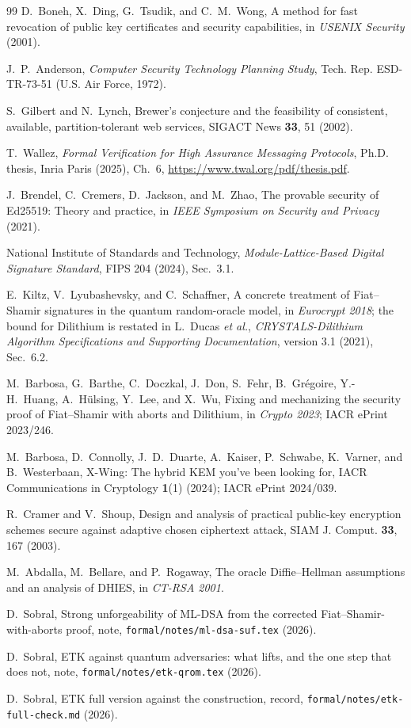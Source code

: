 \documentclass[aps,prx,reprint,superscriptaddress,nofootinbib,floatfix]{revtex4-2}
\theoremstyle{remark}
\begin{document}
\begin{thebibliography}{99}
 D.~Boneh, X.~Ding, G.~Tsudik, and C.~M.~Wong, A method for fast revocation of public key certificates and security capabilities, in \emph{USENIX Security} (2001).

 J.~P.~Anderson, \emph{Computer Security Technology Planning Study}, Tech. Rep. ESD-TR-73-51 (U.S. Air Force, 1972).

 S.~Gilbert and N.~Lynch, Brewer's conjecture and the feasibility of consistent, available, partition-tolerant web services, SIGACT News \textbf{33}, 51 (2002).

 T.~Wallez, \emph{Formal Verification for High Assurance Messaging Protocols}, Ph.D. thesis, Inria Paris (2025), Ch.~6, \url{https://www.twal.org/pdf/thesis.pdf}.

 J.~Brendel, C.~Cremers, D.~Jackson, and M.~Zhao, The provable security of Ed25519: Theory and practice, in \emph{IEEE Symposium on Security and Privacy} (2021).

 National Institute of Standards and Technology, \emph{Module-Lattice-Based Digital Signature Standard}, FIPS 204 (2024), Sec.~3.1.

 E.~Kiltz, V.~Lyubashevsky, and C.~Schaffner, A concrete treatment of Fiat--Shamir signatures in the quantum random-oracle model, in \emph{Eurocrypt 2018}; the bound for Dilithium is restated in L.~Ducas \emph{et al.}, \emph{CRYSTALS-Dilithium Algorithm Specifications and Supporting Documentation}, version 3.1 (2021), Sec.~6.2.

 M.~Barbosa, G.~Barthe, C.~Doczkal, J.~Don, S.~Fehr, B.~Gr\'egoire, Y.-H.~Huang, A.~H\"ulsing, Y.~Lee, and X.~Wu, Fixing and mechanizing the security proof of Fiat--Shamir with aborts and Dilithium, in \emph{Crypto 2023}; IACR ePrint 2023/246.

 M.~Barbosa, D.~Connolly, J.~D.~Duarte, A.~Kaiser, P.~Schwabe, K.~Varner, and B.~Westerbaan, X-Wing: The hybrid KEM you've been looking for, IACR Communications in Cryptology \textbf{1}(1) (2024); IACR ePrint 2024/039.

 R.~Cramer and V.~Shoup, Design and analysis of practical public-key encryption schemes secure against adaptive chosen ciphertext attack, SIAM J. Comput. \textbf{33}, 167 (2003).

 M.~Abdalla, M.~Bellare, and P.~Rogaway, The oracle Diffie--Hellman assumptions and an analysis of DHIES, in \emph{CT-RSA 2001}.

 D.~Sobral, Strong unforgeability of ML-DSA from the corrected Fiat--Shamir-with-aborts proof, note, \texttt{formal/notes/ml-dsa-suf.tex} (2026).

 D.~Sobral, ETK against quantum adversaries: what lifts, and the one step that does not, note, \texttt{formal/notes/etk-qrom.tex} (2026).

 D.~Sobral, ETK full version against the construction, record, \texttt{formal/notes/etk-full-check.md} (2026).

\end{thebibliography}
\end{document}
